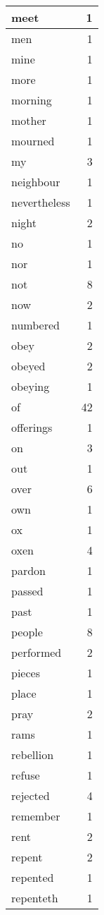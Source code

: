\begin{center}
\begin{longtable}{l|r}
meet & 1 \\ \hline
men & 1 \\ \hline
mine & 1 \\ \hline
more & 1 \\ \hline
morning & 1 \\ \hline
mother & 1 \\ \hline
mourned & 1 \\ \hline
my & 3 \\ \hline
neighbour & 1 \\ \hline
nevertheless & 1 \\ \hline
night & 2 \\ \hline
no & 1 \\ \hline
nor & 1 \\ \hline
not & 8 \\ \hline
now & 2 \\ \hline
numbered & 1 \\ \hline
obey & 2 \\ \hline
obeyed & 2 \\ \hline
obeying & 1 \\ \hline
of & 42 \\ \hline
offerings & 1 \\ \hline
on & 3 \\ \hline
out & 1 \\ \hline
over & 6 \\ \hline
own & 1 \\ \hline
ox & 1 \\ \hline
oxen & 4 \\ \hline
pardon & 1 \\ \hline
passed & 1 \\ \hline
past & 1 \\ \hline
people & 8 \\ \hline
performed & 2 \\ \hline
pieces & 1 \\ \hline
place & 1 \\ \hline
pray & 2 \\ \hline
rams & 1 \\ \hline
rebellion & 1 \\ \hline
refuse & 1 \\ \hline
rejected & 4 \\ \hline
remember & 1 \\ \hline
rent & 2 \\ \hline
repent & 2 \\ \hline
repented & 1 \\ \hline
repenteth & 1 \\ \hline

\end{longtable}
\end{center}
